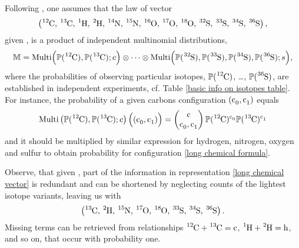 Following \cite{Kienitz1961MassSpectrometry}, one assumes that the law of vector
\begin{equation}\label{long chemical vector}
	\left( \cem{^{12}C},\, \cem{^{13}C},\, \cem{^{1}H},\, \cem{^{2}H},\, \cem{^{14}N},\, \cem{^{15}N},\, \cem{^{16}O},\, \cem{^{17}O},\, \cem{^{18}O},\, \cem{^{32}S},\, \cem{^{33}S},\, \cem{^{34}S},\, \cem{^{36}S} \right),	
\end{equation}
given \molecule, is a product of independent multinomial distributions,
{\small\begin{equation}\label{product of multinomials}
	\MM = \mathrm{Multi} \Big( \prob(\cem{^{12}C}), \prob(\cem{^{13}C}); c \Big)
	\otimes \dots \otimes 
	\mathrm{Multi} \Big( \prob(\cem{^{32}S}), \prob(\cem{^{33}S}), \prob(\cem{^{34}S}), \prob(\cem{^{36}S}); s \Big),	
\end{equation}}
where the probabilities of observing particular isotopes, $\prob(\cem{^{12}C})$, \dots, $\prob(\cem{^{36}S})$, are established in independent experiments, cf. Table \ref{basic info on isotopes table}. For instance, the probability of a given carbons configuration $(\cem{c_0}, \cem{c_1})$ equals
$$
	\mathrm{Multi} \left( \prob(\cem{^{12}C}), \prob(\cem{^{13}C}); c \right)
		\Big( (\cem{c_0}, \cem{c_1}) \Big) = 
	\begin{pmatrix}
		\cem{c} \cr \cem{c_0}, \cem{c_1}  
	\end{pmatrix} \prob(\cem{^{12}C})^\cem{c_0} \prob(\cem{^{13}C})^\cem{c_1}
$$
and it should be multiplied by similar expression for hydrogen, nitrogen, oxygen and sulfur to obtain probability for configuration \eqref{long chemical formula}.


Observe, that given \molecule, part of the information in representation \eqref{long chemical vector} is redundant and can be shortened by neglecting counts of the lightest isotope variants, leaving us with 
\begin{equation}\label{short chemical vector}
 	\left( \cem{^{13}C},\, \cem{^{2}H},\, \cem{^{15}N},\, \cem{^{17}O},\, \cem{^{18}O},\, \cem{^{33}S},\, \cem{^{34}S},\, \cem{^{36}S} \right).	
\end{equation}
Missing terms can be retrieved from relationships $\cem{^{12}C} + \cem{^{13}C} = \cem{c}$, $\cem{^{1}H} + \cem{^{2}H} = \cem{h}$, and so on, that occur with probability one.


